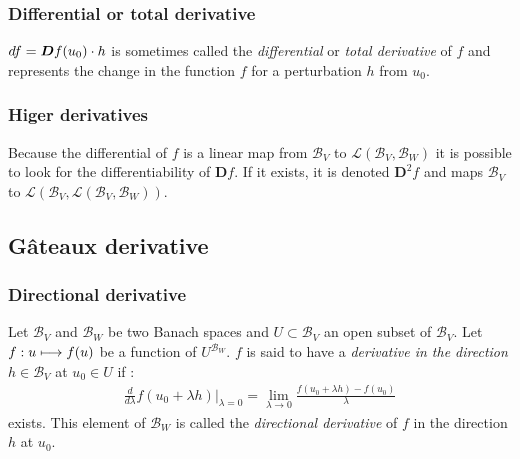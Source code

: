 \subsubsection{Differential or total derivative}

$df = \boldsymbol{D}f(u_0)\cdot h$ is sometimes called the \emph{differential} or \emph{total derivative} of $f$ and represents the change in the function $f$ for a perturbation $h$ from $u_0$.

\subsubsection{Higer derivatives}

Because the differential of $f$ is a linear map from $\mathcal{B}_V$ to $\mathcal{L}(\mathcal{B}_V,{\mathcal{B}_W})$ it is possible to look for the differentiability of $\boldsymbol{D}f$. If it exists, it is denoted $\boldsymbol{D}^2f$ and maps $\mathcal{B}_V$ to $\mathcal{L}(\mathcal{B}_V,\mathcal{L}(\mathcal{B}_V,{\mathcal{B}_W}))$.

\subsection{Gâteaux derivative}
\subsubsection{Directional derivative}
Let $\mathcal{B}_V$ and $\mathcal{B}_W$ be two Banach spaces and $U \subset \mathcal{B}_V$ an open subset of $\mathcal{B}_V$.
Let $f : u \longmapsto f(u)$ be a function of  $U^{\mathcal{B}_W}$.
$f$ is said to have a \emph{derivative in the direction} $h\in\mathcal{B}_V$ at $u_0\in U$ if :
\begin{align}
\frac{d}{d\lambda}f(u_0+\lambda h)\Bigr|_{\lambda = 0} = \lim_{\lambda \to 0} \frac{f(u_0+\lambda h) - f(u_0)}{\lambda}
\end{align}
exists. This element of $\mathcal{B}_W$ is called the \emph{directional derivative} of $f$ in the direction $h$ at $u_0$.

